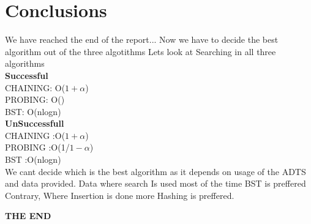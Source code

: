 \documentclass{report}
\begin{document}
\chapter{\Large Conclusions}
\fbox
{
\begin{minipage}{0.75\textwidth}
    We have reached the end of the report...
    Now we have to decide the best algorithm out of the three algotithms
    Lets look at Searching in all three algorithms\\
    \textbf{Successful\\}
    CHAINING: O($1+\alpha$)\\
    PROBING:  O(\log{})\\
     BST:  O(nlogn)\\
    \textbf{UnSuccessfull}\\
    CHAINING :O($1+\alpha$)\\
    PROBING  :O(1/{$1-\alpha$})\\
    BST      :O(nlogn)\\
    We cant decide which is the best algorithm as it depends 
    on usage of the ADTS and data provided.
    Data where search Is used most of the time BST is preffered
    Contrary, Where Insertion is done more Hashing is preffered.
\end{minipage}
}

\printbibliography

\vspace{4cm}

\centering
\textbf{\huge THE END}
\end{document}
